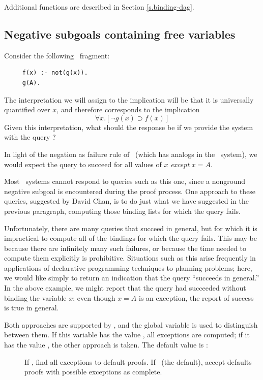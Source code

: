 Additional functions are described in Section \ref{s.binding-dag}.

\subsection{Negative subgoals containing free variables}
\label{s.effort}

Consider the following \prolog\ fragment:
\begin{verbatim}
     f(x) :- not(g(x)).
     g(A).
\end{verbatim}
 The interpretation we will assign to the implication
 will be that it is universally quantified
over $x$, and therefore corresponds to the implication
 \[\forall x.[\neg g(x) \supset f(x)]\]
 Given this interpretation, what should the response be if we provide
the system with the query ?

In light of the negation as failure rule of \prolog\ (which has analogs
in the \mvl\ system), we would expect the query to succeed for all values
of $x$ {\em except\/} $x=A$.

Most \prolog\ systems cannot respond to queries such as this one, since
a nonground negative subgoal is encountered during the proof process.
One approach to these queries, suggested by David Chan, is to do just
what we have suggested in the previous paragraph, computing those binding
lists for which the query fails.

Unfortunately, there are many queries that succeed in general, but
for which it is impractical to compute all of the bindings for which
the query fails.  This may be because there are infinitely many such
failures, or because the time needed to compute them explicitly is
prohibitive.  Situations such as this arise frequently in
applications of declarative programming techniques to planning
problems; here, we would like simply to return an indication that the
query ``succeeds in general.''  In the above example, we might
report that the query had succeeded without binding the variable $x$;
even though $x=A$ is an exception, the report of success is true in
general.

Both approaches are supported by \mvl, and the global variable
 is used to distinguish between them.  If
this variable has the value \T, all exceptions are computed; if it
has the value \NIL, the other approach is taken.  The default value
is \NIL:
 \begin{description}
 \item [] If \T, find all exceptions
to default proofs.  If \NIL\ (the default), accept defaults proofs
with possible exceptions as complete.
 \end{description}

